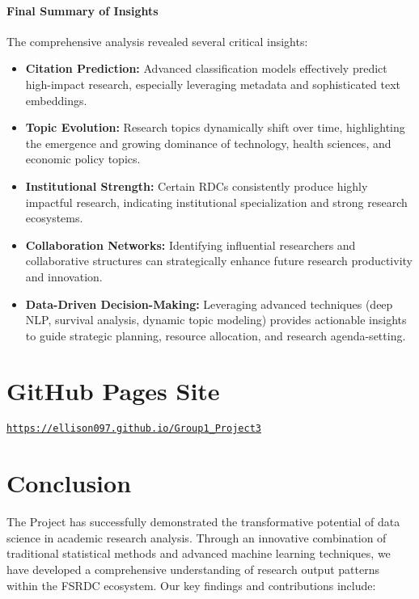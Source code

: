 \documentclass[12pt]{article}
\begin{document}
\paragraph{Final Summary of Insights}
The comprehensive analysis revealed several critical insights:
\begin{itemize}
  \item \textbf{Citation Prediction:} Advanced classification models effectively predict high-impact research, especially leveraging metadata and sophisticated text embeddings.
  \item \textbf{Topic Evolution:} Research topics dynamically shift over time, highlighting the emergence and growing dominance of technology, health sciences, and economic policy topics.
  \item \textbf{Institutional Strength:} Certain RDCs consistently produce highly impactful research, indicating institutional specialization and strong research ecosystems.
  \item \textbf{Collaboration Networks:} Identifying influential researchers and collaborative structures can strategically enhance future research productivity and innovation.
  \item \textbf{Data-Driven Decision-Making:} Leveraging advanced techniques (deep NLP, survival analysis, dynamic topic modeling) provides actionable insights to guide strategic planning, resource allocation, and research agenda-setting.
\end{itemize}

\section{GitHub Pages Site}
\href{https://ellison097.github.io/Group1_Project3}{\texttt{https://ellison097.github.io/Group1\_Project3}}

\section{Conclusion}
The Project has successfully demonstrated the transformative potential of data science in academic research analysis. Through an innovative combination of traditional statistical methods and advanced machine learning techniques, we have developed a comprehensive understanding of research output patterns within the FSRDC ecosystem. Our key findings and contributions include:
\end{document}
